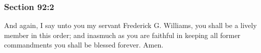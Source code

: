 
	\subsubsection{Section 92:2} %
		\label{DC92-2}

		And again, I say unto you my servant Frederick G. Williams, you shall be a lively member in this order; and inasmuch as you are faithful in keeping all former commandments you shall be blessed forever.  Amen.

